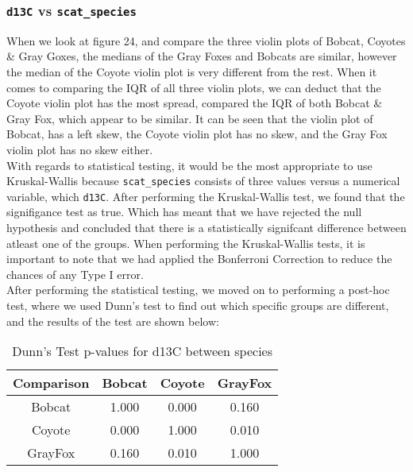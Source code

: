 \documentclass[a4paper]{article}
\begin{document}
\subsubsection{\texttt{d13C} vs \texttt{scat\_species}}
When we look at figure 24, and compare the three violin plots of Bobcat, Coyotes \& Gray Goxes, the medians of the Gray Foxes and Bobcats are similar, however
the median of the Coyote violin plot is very different from the rest. When it comes to comparing the IQR of all three violin plots, we can deduct that the
Coyote violin plot has the most spread, compared the IQR of both Bobcat \& Gray Fox, which appear to be similar. It can be seen that the violin plot of 
Bobcat, has a left skew, the Coyote violin plot has no skew, and the Gray Fox violin plot has no skew either. \\

\noindent With regards to statistical testing, it would be the most appropriate to use Kruskal-Wallis because \texttt{scat\_species} consists of three values
versus a numerical variable, which \texttt{d13C}. After performing the Kruskal-Wallis test, we found that the signifigance test as true. Which has meant that
we have rejected the null hypothesis and concluded that there is a statistically signifcant difference between atleast one of the groups. When performing the
Kruskal-Wallis tests, it is important to note that we had applied the Bonferroni Correction to reduce the chances of any Type I error. \\

\noindent After performing the statistical testing, we moved on to performing a post-hoc test, where we used Dunn's test to find out which specific groups are
different, and the results of the test are shown below: \\

\begin{table}[h!]
    \centering
    \begin{tabular}{|c|c|c|c|}
    \hline
    \textbf{Comparison} & \textbf{Bobcat} & \textbf{Coyote} & \textbf{GrayFox} \\
    \hline
    Bobcat & 1.000 & 0.000 & 0.160 \\
    \hline
    Coyote & 0.000 & 1.000 & 0.010 \\
    \hline
    GrayFox & 0.160 & 0.010 & 1.000 \\
    \hline
    \end{tabular}
    \caption{Dunn's Test p-values for d13C between species}
    \label{tab:dunn_d13C}
\end{table}
\end{document}
